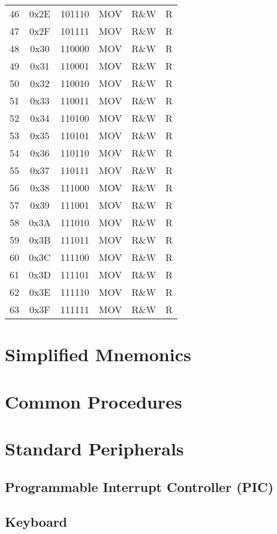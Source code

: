 \documentclass[oneside, a4paper]{memoir}
\begin{document}
\begin{center}
\begin{longtable}{cccccc}
46 & 0x2E & 101110 & MOV   & R\&W  & R  \\
47 & 0x2F & 101111 & MOV   & R\&W  & R  \\
48 & 0x30 & 110000 & MOV   & R\&W  & R  \\
49 & 0x31 & 110001 & MOV   & R\&W  & R  \\
50 & 0x32 & 110010 & MOV   & R\&W  & R  \\
51 & 0x33 & 110011 & MOV   & R\&W  & R  \\
52 & 0x34 & 110100 & MOV   & R\&W  & R  \\
53 & 0x35 & 110101 & MOV   & R\&W  & R  \\
54 & 0x36 & 110110 & MOV   & R\&W  & R  \\
55 & 0x37 & 110111 & MOV   & R\&W  & R  \\
56 & 0x38 & 111000 & MOV   & R\&W  & R  \\
57 & 0x39 & 111001 & MOV   & R\&W  & R  \\
58 & 0x3A & 111010 & MOV   & R\&W  & R  \\
59 & 0x3B & 111011 & MOV   & R\&W  & R  \\
60 & 0x3C & 111100 & MOV   & R\&W  & R  \\
61 & 0x3D & 111101 & MOV   & R\&W  & R  \\
62 & 0x3E & 111110 & MOV   & R\&W  & R  \\
63 & 0x3F & 111111 & MOV   & R\&W  & R  \\
\end{longtable}
\end{center}

\chapter{Simplified Mnemonics}

\chapter{Common Procedures}

\chapter{Standard Peripherals}
\section{Programmable Interrupt Controller (PIC)}
\section{Keyboard}
\end{document}
